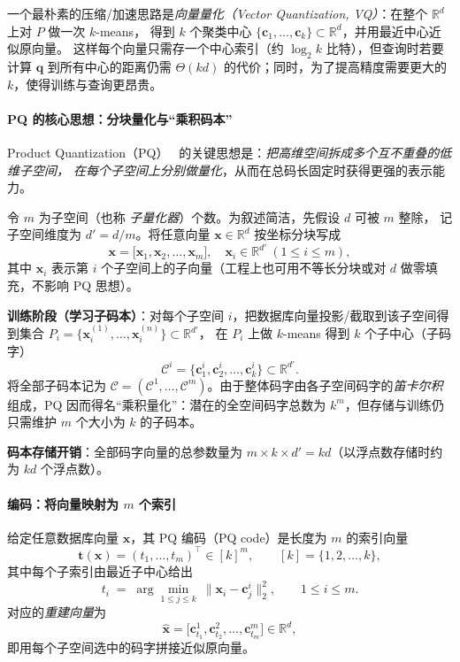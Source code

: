 \documentclass[lang=cn,newtx,10pt,scheme=chinese,chinesefont=nofont,citestyle=gb7714-2015, bibstyle=gb7714-2015]{elegantbook}
\begin{document}
\begin{refsection}
一个最朴素的压缩/加速思路是\emph{向量量化（Vector Quantization, VQ）}：在整个 $\mathbb{R}^d$ 上对 $P$ 做一次 $k$-means，
得到 $k$ 个聚类中心 $\{\mathbf{c}_1,\ldots,\mathbf{c}_k\}\subset\mathbb{R}^d$，并用最近中心近似原向量。
这样每个向量只需存一个中心索引（约 $\log_2 k$ 比特），但查询时若要计算 $\mathbf{q}$ 到所有中心的距离仍需
$\Theta(kd)$ 的代价；同时，为了提高精度需要更大的 $k$，使得训练与查询更昂贵。

\paragraph{PQ 的核心思想：分块量化与“乘积码本”}
Product Quantization（PQ）~\cite{5432202} 的关键思想是：\emph{把高维空间拆成多个互不重叠的低维子空间，
在每个子空间上分别做量化}，从而在总码长固定时获得更强的表示能力。

令 $m$ 为子空间（也称 \emph{子量化器}）个数。为叙述简洁，先假设 $d$ 可被 $m$ 整除，
记子空间维度为 $d' = d/m$。将任意向量 $\mathbf{x}\in\mathbb{R}^d$ 按坐标分块写成
\[
\mathbf{x} = \big[\mathbf{x}_1,\mathbf{x}_2,\ldots,\mathbf{x}_m\big],\quad
\mathbf{x}_i\in\mathbb{R}^{d'}\ (1\le i\le m),
\]
其中 $\mathbf{x}_i$ 表示第 $i$ 个子空间上的子向量（工程上也可用不等长分块或对 $d$ 做零填充，不影响 PQ 思想）。

\textbf{训练阶段（学习子码本）}：对每个子空间 $i$，把数据库向量投影/截取到该子空间得到集合
$P_i=\{\mathbf{x}^{(1)}_i,\ldots,\mathbf{x}^{(n)}_i\}\subset\mathbb{R}^{d'}$，
在 $P_i$ 上做 $k$-means 得到 $k$ 个子中心（子码字）
\[
\mathcal{C}^i=\{\mathbf{c}_1^i,\mathbf{c}_2^i,\ldots,\mathbf{c}_k^i\}\subset\mathbb{R}^{d'}.
\]
将全部子码本记为 $\mathcal{C}=(\mathcal{C}^1,\ldots,\mathcal{C}^m)$。由于整体码字由各子空间码字的\emph{笛卡尔积}
组成，PQ 因而得名“乘积量化”：潜在的全空间码字总数为 $k^m$，但存储与训练仍只需维护 $m$ 个大小为 $k$ 的子码本。

\textbf{码本存储开销}：全部码字向量的总参数量为
$m\times k\times d' = kd$（以浮点数存储时约为 $kd$ 个浮点数）。

\paragraph{编码：将向量映射为 $m$ 个索引}
给定任意数据库向量 $\mathbf{x}$，其 PQ 编码（PQ code）是长度为 $m$ 的索引向量
\[
\mathbf{t}(\mathbf{x})=(t_1,\ldots,t_m)^\top \in [k]^m,\qquad [k]=\{1,2,\ldots,k\},
\]
其中每个子索引由最近子中心给出
\[
t_i \;=\; \arg\min_{1\le j\le k}\ \|\mathbf{x}_i-\mathbf{c}_j^i\|_2^2,\qquad 1\le i\le m.
\]
对应的\emph{重建向量}为
\[
\widehat{\mathbf{x}}=\big[\mathbf{c}_{t_1}^1,\mathbf{c}_{t_2}^2,\ldots,\mathbf{c}_{t_m}^m\big]\in\mathbb{R}^d,
\]
即用每个子空间选中的码字拼接近似原向量。


\end{refsection}
\end{document}
